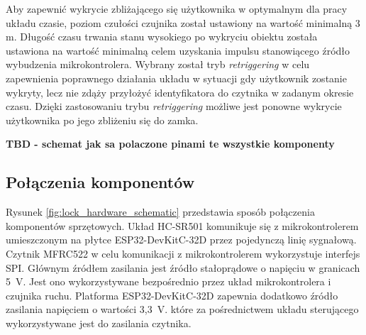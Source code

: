             Aby zapewnić wykrycie zbliżającego się użytkownika w optymalnym dla pracy układu czasie, poziom czułości czujnika został ustawiony na wartość minimalną 3 m. Długość czasu trwania stanu wysokiego po wykryciu obiektu została ustawiona na wartość minimalną celem uzyskania impulsu stanowiącego źródło wybudzenia mikrokontrolera. Wybrany został tryb \textit{retriggering} w celu zapewnienia poprawnego działania układu w sytuacji gdy użytkownik zostanie wykryty, lecz nie zdąży przyłożyć identyfikatora do czytnika w zadanym okresie czasu. Dzięki zastosowaniu trybu \textit{retriggering} możliwe jest ponowne wykrycie użytkownika po jego zbliżeniu się do zamka.

            \textbf{TBD - schemat jak sa polaczone pinami te wszystkie komponenty}

        \subsection{Połączenia komponentów}

            Rysunek \ref{fig:lock_hardware_schematic} przedstawia sposób połączenia komponentów sprzętowych. Układ HC-SR501 komunikuje się z mikrokontrolerem umieszczonym na płytce ESP32-DevKitC-32D przez pojedynczą linię sygnałową. Czytnik MFRC522 w celu komunikacji z mikrokontrolerem wykorzystuje interfejs SPI. Głównym źródłem zasilania jest źródło stałoprądowe o napięciu w granicach 5~V. Jest ono wykorzystywane bezpośrednio przez układ mikrokontrolera i czujnika ruchu. Platforma ESP32-DevKitC-32D zapewnia dodatkowo źródło zasilania napięciem o wartości 3,3~V. które za pośrednictwem układu sterującego wykorzystywane jest do zasilania czytnika.

